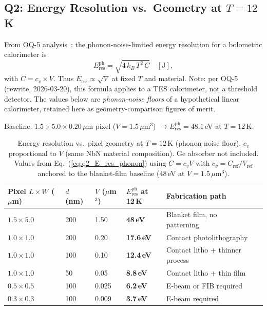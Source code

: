 \subsection{Q2: Energy Resolution vs.\ Geometry at $T = 12$\,K}
\label{sec:q2}

From OQ-5 analysis~\cite{Richards1994}: %
the phonon-noise-limited energy resolution for a bolometric calorimeter is
\begin{equation}
  E_\mathrm{res}^\mathrm{ph} = \sqrt{4\,k_B\,T^2\,C}
  \quad [\text{J}],
  \label{eq:q2_E_res_phonon}
\end{equation}
with $C = c_v \times V$. Thus $E_\mathrm{res} \propto \sqrt{V}$ at fixed $T$ and
material. Note: per OQ-5 (rewrite, 2026-03-20), this formula applies to a TES
calorimeter, not a threshold detector. The values below are \emph{phonon-noise
floors} of a hypothetical linear calorimeter, retained here as geometry-comparison
figures of merit.

Baseline: $1.5 \times 5.0 \times 0.20\,\mu$m pixel
($V = 1.5\,\mu$m$^3$) $\to E_\mathrm{res}^\mathrm{ph} = 48.1$\,eV at $T=12$\,K.

\begin{table}[ht]
\centering
\caption{Energy resolution vs.\ pixel geometry at $T = 12$\,K (phonon-noise floor).
  $c_v$ proportional to $V$ (same NbN material composition). Ge absorber not included.
  Values from Eq.~(\ref{eq:q2_E_res_phonon}) using $C = c_v V$ with $c_v = C_\mathrm{ref}/V_\mathrm{ref}$
  anchored to the blanket-film baseline (48\,eV at $V = 1.5\,\mu$m$^3$).}
\label{tab:q2_E_res_geometry}
\small
\begin{tabular}{@{}llllll@{}}
\toprule
Pixel $L \times W$ ($\mu$m) & $d$ (nm) & $V$ ($\mu$m$^3$)
  & $E_\mathrm{res}^\mathrm{ph}$ at 12\,K & Fabrication path \\
\midrule
$1.5 \times 5.0$ & 200 & 1.50 & \textbf{48\,eV} & Blanket film, no patterning \\
$1.0 \times 1.0$ & 200 & 0.20 & \textbf{17.6\,eV} & Contact photolithography \\
$1.0 \times 1.0$ & 100 & 0.10 & \textbf{12.4\,eV} & Contact litho + thinner process \\
$1.0 \times 1.0$ & 50  & 0.05 & \textbf{8.8\,eV}  & Contact litho + thin film \\
$0.5 \times 0.5$ & 100 & 0.025 & \textbf{6.2\,eV} & E-beam or FIB required \\
$0.3 \times 0.3$ & 100 & 0.009 & \textbf{3.7\,eV} & E-beam required \\
\bottomrule
\end{tabular}
\end{table}

